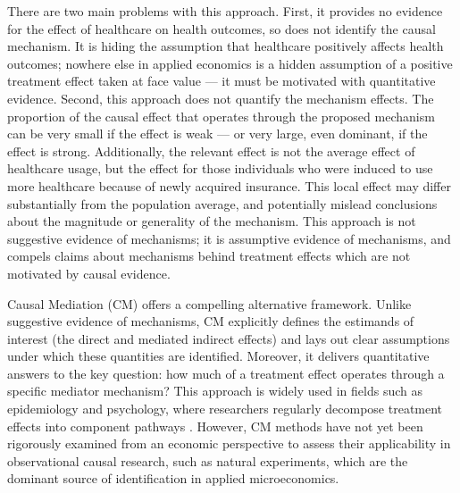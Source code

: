 There are two main problems with this approach.
First, it provides no evidence for the effect of healthcare on health outcomes, so does not identify the causal mechanism.
It is hiding the assumption that healthcare positively affects health outcomes; nowhere else in applied economics is a hidden assumption of a positive treatment effect taken at face value --- it must be motivated with quantitative evidence.
Second, this approach does not quantify the mechanism effects.
The proportion of the causal effect that operates through the proposed mechanism can be very small if the effect is weak --- or very large, even dominant, if the effect is strong.
Additionally, the relevant effect is not the average effect of healthcare usage, but the effect for those individuals who were induced to use more healthcare because of newly acquired insurance. 
This local effect may differ substantially from the population average, and potentially mislead conclusions about the magnitude or generality of the mechanism.
This approach is not suggestive evidence of mechanisms; it is assumptive evidence of mechanisms, and compels claims about mechanisms behind treatment effects which are not motivated by causal evidence.


Causal Mediation (CM) offers a compelling alternative framework.
Unlike suggestive evidence of mechanisms, CM explicitly defines the estimands of interest (the direct and mediated indirect effects) and lays out clear assumptions under which these quantities are identified.
Moreover, it delivers quantitative answers to the key question: how much of a treatment effect operates through a specific mediator mechanism?
This approach is widely used in fields such as epidemiology and psychology, where researchers regularly decompose treatment effects into component pathways \citep{imai2010identification}.
However, CM methods have not yet been rigorously examined from an economic perspective to assess their applicability in observational causal research, such as natural experiments, which are the dominant source of identification in applied microeconomics.
